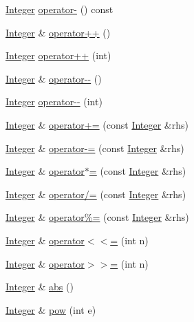 \begin{DoxyCompactItemize}
\item 
\hyperlink{classInteger}{Integer} \hyperlink{classInteger_ae9d1fb575b55ac2f6352a2d735c4bb75}{operator-\/} () const 
\item 
\hyperlink{classInteger}{Integer} \& \hyperlink{classInteger_a3fc47ae07dce44aa72ce9e02b9a3e003}{operator++} ()
\item 
\hyperlink{classInteger}{Integer} \hyperlink{classInteger_a326d5bd7d72ad858f523bed95ae66150}{operator++} (int)
\item 
\hyperlink{classInteger}{Integer} \& \hyperlink{classInteger_ac6227ea2b4a75ff08d537db0d3a26be4}{operator-\/-\/} ()
\item 
\hyperlink{classInteger}{Integer} \hyperlink{classInteger_ae5b697679221dbf1fbc942335bb19fb4}{operator-\/-\/} (int)
\item 
\hyperlink{classInteger}{Integer} \& \hyperlink{classInteger_a0c37e366a26b17cfd73b1b29a1e8b47b}{operator+=} (const \hyperlink{classInteger}{Integer} \&rhs)
\item 
\hyperlink{classInteger}{Integer} \& \hyperlink{classInteger_a2bff1e6dc8f6990028783da8bdd89b0d}{operator-\/=} (const \hyperlink{classInteger}{Integer} \&rhs)
\item 
\hyperlink{classInteger}{Integer} \& \hyperlink{classInteger_acf1388dc4ce49c9b7d69b3b6c3a245f7}{operator$\ast$=} (const \hyperlink{classInteger}{Integer} \&rhs)
\item 
\hyperlink{classInteger}{Integer} \& \hyperlink{classInteger_aa13c715bbc68c58c2bd1f1b49a80277e}{operator/=} (const \hyperlink{classInteger}{Integer} \&rhs)
\item 
\hyperlink{classInteger}{Integer} \& \hyperlink{classInteger_a5af44fd8bef5e32fa720b1262045f1b7}{operator\%=} (const \hyperlink{classInteger}{Integer} \&rhs)
\item 
\hyperlink{classInteger}{Integer} \& \hyperlink{classInteger_a4114e69e0da713f50f9cf946cfc70637}{operator$<$$<$=} (int n)
\item 
\hyperlink{classInteger}{Integer} \& \hyperlink{classInteger_a0fbada94834715ce6b91c39e5d41d24f}{operator$>$$>$=} (int n)
\item 
\hyperlink{classInteger}{Integer} \& \hyperlink{classInteger_a28b38b99580e4787e353c6630c3cf063}{abs} ()
\item 
\hyperlink{classInteger}{Integer} \& \hyperlink{classInteger_aae56deca12053a28469749c93c9f7343}{pow} (int e)
\end{DoxyCompactItemize}
